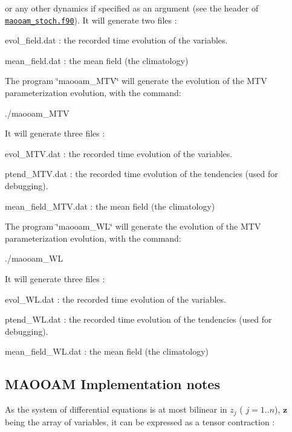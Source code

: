 or any other dynamics if specified as an argument (see the header of \href{./maooam_stoch.f90}{\tt maooam\+\_\+stoch.\+f90}). It will generate two files \+:
\begin{DoxyItemize}
\item evol\+\_\+field.\+dat \+: the recorded time evolution of the variables.
\item mean\+\_\+field.\+dat \+: the mean field (the climatology)
\end{DoxyItemize}

The program \char`\"{}maooam\+\_\+\+M\+T\+V\char`\"{} will generate the evolution of the M\+TV parameterization evolution, with the command\+: \begin{DoxyVerb}./maooam_MTV
\end{DoxyVerb}


It will generate three files \+:
\begin{DoxyItemize}
\item evol\+\_\+\+M\+T\+V.\+dat \+: the recorded time evolution of the variables.
\item ptend\+\_\+\+M\+T\+V.\+dat \+: the recorded time evolution of the tendencies (used for debugging).
\item mean\+\_\+field\+\_\+\+M\+T\+V.\+dat \+: the mean field (the climatology)
\end{DoxyItemize}

The program \char`\"{}maooam\+\_\+\+W\+L\char`\"{} will generate the evolution of the M\+TV parameterization evolution, with the command\+: \begin{DoxyVerb}./maooam_WL
\end{DoxyVerb}


It will generate three files \+:
\begin{DoxyItemize}
\item evol\+\_\+\+W\+L.\+dat \+: the recorded time evolution of the variables.
\item ptend\+\_\+\+W\+L.\+dat \+: the recorded time evolution of the tendencies (used for debugging).
\item mean\+\_\+field\+\_\+\+W\+L.\+dat \+: the mean field (the climatology) 


\end{DoxyItemize}

\subsection*{M\+A\+O\+O\+AM Implementation notes}

As the system of differential equations is at most bilinear in $z_j$ ( $j=1..n$), $\boldsymbol{z}$ being the array of variables, it can be expressed as a tensor contraction \+:

